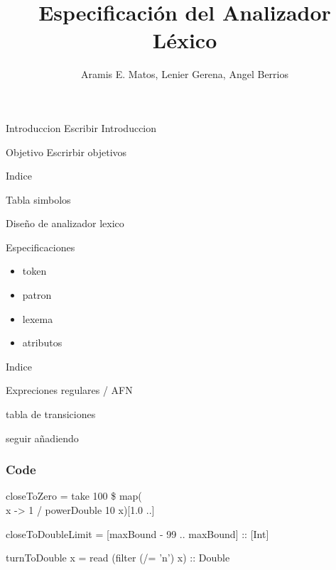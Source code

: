 \documentclass[14pt, aspectratio=169]{beamer}
\title{Especificación del Analizador Léxico}
\author{Aramis E. Matos, Lenier Gerena, Angel Berrios}
\begin{document}
\maketitle
\begin{frame}{Introduccion}
    \small Escribir Introduccion 
\end{frame}

\begin{frame}{Objetivo}
    \small Escrirbir objetivos 
\end{frame}

\begin{frame}{Indice}
    \item Tabla simbolos
    \item Diseño de analizador lexico
    \item Especificaciones  
    \begin{itemize}
        \item token
        \item patron
        \item lexema
        \item atributos
    \end{itemize}
\end{frame}

\begin{frame}{Indice}
    \item Expreciones regulares / AFN
    \item tabla de transiciones 
    \item seguir añadiendo
\end{frame}

\begin{frame}[fragile=singleslide]
    \frametitle{Code}
    \small
closeToZero = take 100 \$ map(\\x -> 1 / powerDouble 10 x)[1.0 ..]

closeToDoubleLimit = [maxBound - 99 .. maxBound] :: [Int]

turnToDouble x = read (filter (/= 'n') x) :: Double

\end{frame}
\end{document}
